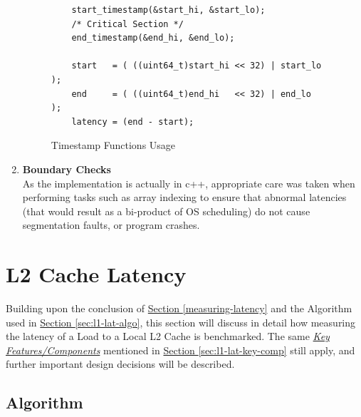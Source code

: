 \documentclass[bsc,frontabs,twoside,singlespacing,parskip,deptreport]{infthesis}     %
\begin{document}
\begin{enumerate}
{\begin{figure}[h!]
\begin{verbatim}
    start_timestamp(&start_hi, &start_lo);
    /* Critical Section */
    end_timestamp(&end_hi, &end_lo);  
    
    start   = ( ((uint64_t)start_hi << 32) | start_lo );
    end     = ( ((uint64_t)end_hi   << 32) | end_lo   );
    latency = (end - start);
        \end{verbatim}
        \caption{Timestamp Functions Usage}
        \label{fig:timestamp_usage_l1}
    \end{figure}
    
    }
    \item{{\bf Boundary Checks} \\
    As the implementation is actually in c++, appropriate care was taken when performing tasks such as array indexing to ensure that abnormal latencies (that would result as a bi-product of OS scheduling) do not cause segmentation faults, or program crashes. }
\end{enumerate}



\newpage
\section{L2 Cache Latency}
Building upon the conclusion of \hyperref[measuring-latency]{Section \ref{measuring-latency}} and the Algorithm used in \hyperref[measuring-latency]{Section \ref{sec:l1-lat-algo}}, this section will discuss in detail how measuring the latency of a Load to a Local L2 Cache is benchmarked. The same \hyperref[sec:l1-lat-key-comp]{\emph{Key Features/Components}} mentioned in \hyperref[measuring-latency]{Section \ref{sec:l1-lat-key-comp}} still apply, and further important design decisions will be described.

\subsection{Algorithm}\label{sec:l2-lat-algo}
\end{document}
